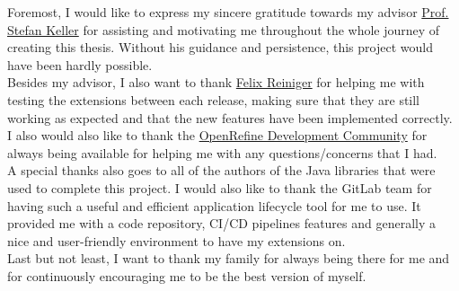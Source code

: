 Foremost, I would like to express my sincere gratitude towards my advisor \href{mailto:stefan.keller@ost.ch}{Prof. Stefan Keller}
for assisting and motivating me throughout the whole journey of creating this thesis.
Without his guidance and persistence, this project would have been hardly possible.\\
\newline
Besides my advisor, I also want to thank \href{mailto:felix.reiniger@ost.ch}{Felix Reiniger} for helping me with testing the extensions between each release, making sure
that they are still working as expected and that the new features have been implemented correctly.\\
\newline
I also would also like to thank the \href{https://groups.google.com/g/openrefine-dev}{OpenRefine Development Community} for always being available for helping me with any questions/concerns that I had.\\
\newline
A special thanks also goes to all of the authors of the Java libraries that were used to complete this project. I would also like to thank the GitLab team for having such a useful and efficient application lifecycle tool for me to use. It provided me with a code repository, CI/CD pipelines features and generally a nice and user-friendly environment to have my extensions on.\\
\newline
Last but not least, I want to thank my family for always being there for me and for continuously encouraging me to be the best version of myself.

